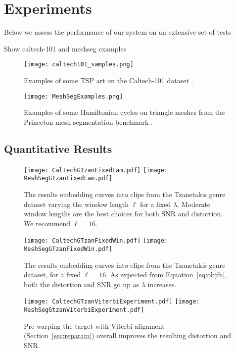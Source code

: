 \documentclass[runningheads]{llncs}
\begin{document}
\section{Experiments}
\label{sec:experiments}

Below we assess the performance of our system on an extensive set of tests

Show caltech-101 and meshseg examples

\begin{figure}
  \centering
  \texttt{[image: caltech101\_samples.png]}
  \caption{Examples of some TSP art on the Caltech-101 dataset \cite{li_andreeto_ranzato_perona_2022}.}
  \label{fig:caltech101examples}
\end{figure}

\begin{figure}
  \centering
  \texttt{[image: MeshSegExamples.png]}
  \caption{Examples of some Hamiltonian cycles on triangle meshes from the Princeton mesh segmentation benchmark \cite{Chen:2009:ABF}.}
  \label{fig:meshsegexamples}
\end{figure}

\subsection{Quantitative Results}


\begin{figure}
  \centering
  \texttt{[image: CaltechGTzanFixedLam.pdf]}
  \texttt{[image: MeshSegGTzanFixedLam.pdf]}
  \caption{The results embedding curves into clips from the Tzanetakis genre dataset varying the window length $\ell$ for a fixed $\lambda$.  Moderate window lengths are the best choices for both SNR and distortion.  We recommend $\ell=16$.}
  \label{fig:ResultsFixedLam}
\end{figure}

\begin{figure}
  \centering
  \texttt{[image: CaltechGTzanFixedWin.pdf]}
  \texttt{[image: MeshSegGTzanFixedWin.pdf]}
  \caption{The results embedding curves into clips from the Tzanetakis genre dataset, for a fixed $\ell=16$.  As expected from Equation~\ref{eq:objfn}, both the distortion and SNR go up as $\lambda$ increases.}
  \label{fig:ResultsFixedWin}
\end{figure}

\begin{figure}
  \centering
  \texttt{[image: CaltechGTzanViterbiExperiment.pdf]}
  \texttt{[image: MeshSegGtzanViterbiExperiment.pdf]}
  \caption{Pre-warping the target with Viterbi alignment (Section~\ref{sec:reparam}) overall improves the resulting distortion and SNR.}
  \label{fig:ResultsViterbiExperiment}
\end{figure}
\end{document}
